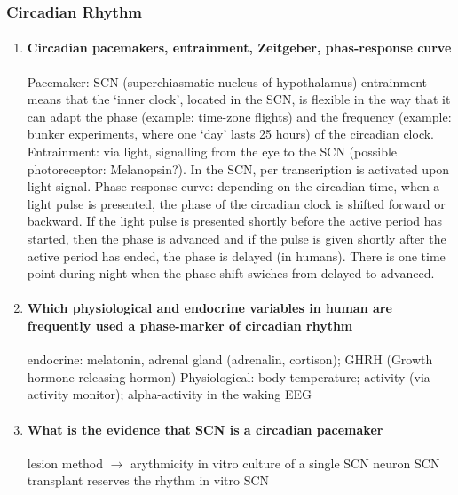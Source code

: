 \documentclass[12pt,article,oneside,a4paper]{memoir}
\begin{document}
\subsubsection{Circadian Rhythm}
\begin{enumerate}
\item \paragraph{Circadian pacemakers, entrainment, Zeitgeber, phas-response curve}

Pacemaker: SCN (superchiasmatic nucleus of hypothalamus)
	entrainment means that the ‘inner clock’, located in the SCN, is flexible in the way that it can adapt the phase (example: time-zone flights) and the frequency (example: bunker experiments, where one ‘day’ lasts 25 hours) of the circadian clock.
	Entrainment: via light, signalling from the eye to the SCN (possible photoreceptor: Melanopsin?). In the SCN, per transcription is activated upon light signal.
Phase-response curve: depending on the circadian time, when a light pulse is presented, the phase of the circadian clock is shifted forward or backward. If the light pulse is presented shortly before the active period has started, then the phase is advanced and if the pulse is given shortly after the active period has ended, the phase is delayed (in humans). There is one time point during night when the phase shift swiches from delayed to advanced.

\item \paragraph{Which physiological and endocrine variables in human are frequently used a phase-marker of circadian rhythm}

endocrine: melatonin, adrenal gland (adrenalin, cortison); GHRH (Growth hormone releasing hormon)
	Physiological: body temperature; activity (via activity monitor); alpha-activity in the waking EEG

\item \paragraph{What is the evidence that SCN is a circadian pacemaker}

lesion method $\rightarrow$ arythmicity
         in vitro culture of a single SCN neuron    
         SCN transplant reserves the rhythm
         in vitro SCN


\end{enumerate}
\end{document}
